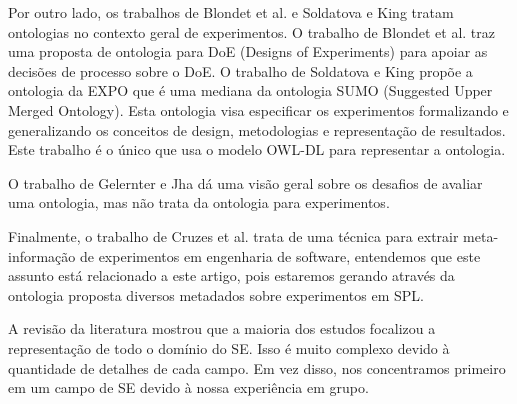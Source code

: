 Por outro lado, os trabalhos de Blondet et al. \cite{blondet2016ode} e Soldatova e King \cite{soldatova2006ontology} tratam ontologias no contexto geral de experimentos. O trabalho de Blondet et al. \cite{blondet2016ode} traz uma proposta de ontologia para DoE (Designs of Experiments) para apoiar as decisões de processo sobre o DoE. O trabalho de Soldatova e King \cite{soldatova2006ontology} propõe a ontologia da EXPO que é uma mediana da ontologia SUMO (Suggested Upper Merged Ontology). Esta ontologia visa especificar os experimentos formalizando e generalizando os conceitos de design, metodologias e representação de resultados. Este trabalho é o único que usa o modelo OWL-DL para representar a ontologia.

O trabalho de Gelernter e Jha \cite{gelernter2016challenges} dá uma visão geral sobre os desafios de avaliar uma ontologia, mas não trata da ontologia para experimentos.

Finalmente, o trabalho de Cruzes et al. \cite{cruzes2007extracting} trata de uma técnica para extrair meta-informação de experimentos em engenharia de software, entendemos que este assunto está relacionado a este artigo, pois estaremos gerando através da ontologia proposta diversos metadados sobre experimentos em SPL.

A revisão da literatura mostrou que a maioria dos estudos focalizou a representação de todo o domínio do SE. Isso é muito complexo devido à quantidade de detalhes de cada campo. Em vez disso, nos concentramos primeiro em um campo de SE devido à nossa experiência em grupo.